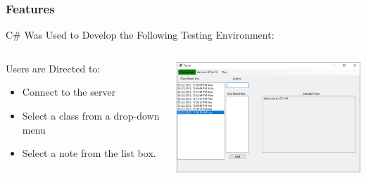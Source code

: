 \documentclass[aspectratio=169]{beamer}
\begin{document}
\begin{frame}
    \frametitle{Features}

    
    \begin{block}{\centering C\# Was Used to Develop the Following Testing Environment:}
    \end{block}
    \begin{columns}
        \begin{column}{0.3\textwidth}
            \begin{block}{Users are Directed to:}
            \begin{itemize}
                \item Connect to the server
                \item Select a class from a drop-down menu
                \item Select a note from the list box.
            \end{itemize}
            \end{block}
        \end{column}
        \begin{column}{0.48\textwidth}
            \includegraphics[width=8cm]{Sample_of_Features}
        \end{column}
    \end{columns}

\end{frame}
\end{document}
